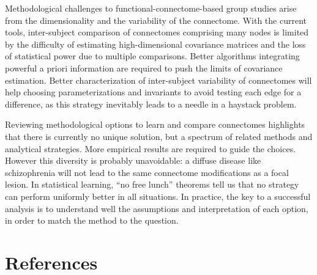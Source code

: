 \documentclass[5p]{elsarticle}
\begin{document}
Methodological challenges to functional-connectome-based group studies
arise from the dimensionality and the variability of the connectome. With
the current tools, inter-subject comparison of connectomes comprising
many nodes is limited by the difficulty of estimating high-dimensional
covariance matrices and the loss of statistical power due to multiple
comparisons. Better algorithms integrating powerful a priori information are required
to push the limits of covariance estimation. Better characterization of
inter-subject variability of connectomes \cite{kelly2012} will help
choosing parameterizations and invariants to avoid testing each edge for
a difference, as this strategy inevitably leads to a needle in a haystack
problem.

Reviewing methodological options to learn and compare connectomes
highlights that there is currently no unique solution, but a spectrum of
related methods and analytical strategies. More empirical results are
required to guide the choices. However this diversity is probably
unavoidable: a diffuse disease like schizophrenia will not lead to the
same connectome modifications as a focal lesion. In statistical learning,
``no free lunch'' theorems \cite{wolpert1996} tell us that no strategy
can perform uniformly better in all situations. In practice, the key to a
successful analysis is to understand well the assumptions and
interpretation of each option, in order to match the method to the
question.


{
\section*{References}
\small
%

 }

\end{document}

